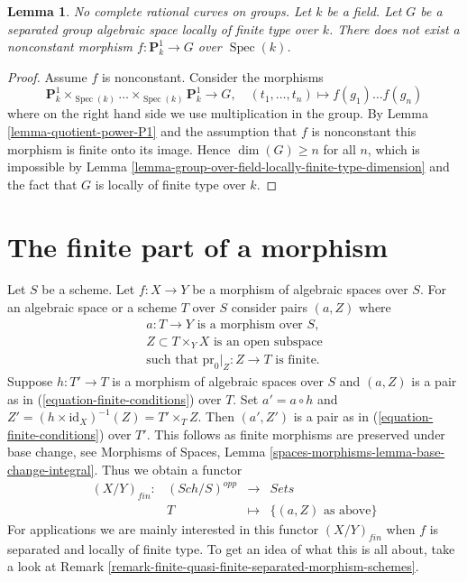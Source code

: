 \documentclass{stacks-project}
\newenvironment{slogan}{\comment}{\endcomment}
\theoremstyle{plain}
\newtheorem{lemma}[subsection]{Lemma}
\theoremstyle{definition}
\theoremstyle{remark}
\numberwithin{equation}{subsection}
\def\Spec{\mathop{\mathrm{Spec}}}
\def\Sch{\mathit{Sch}}
\begin{document}
\begin{lemma}
\label{lemma-no-nonconstant-morphism-from-P1-to-group}
\begin{slogan}
No complete rational curves on groups.
\end{slogan}
Let $k$ be a field. Let $G$ be a separated group algebraic space locally
of finite type over $k$. There does not exist a nonconstant
morphism $f : \mathbf{P}^1_k \to G$ over $\Spec(k)$.
\end{lemma}

\begin{proof}
Assume $f$ is nonconstant. Consider the morphisms
$$
\mathbf{P}^1_k \times_{\Spec(k)} \ldots \times_{\Spec(k)} \mathbf{P}^1_k
\longrightarrow G,
\quad (t_1, \ldots, t_n) \longmapsto f(g_1) \ldots f(g_n)
$$
where on the right hand side we use multiplication in the group.
By Lemma \ref{lemma-quotient-power-P1} and the assumption that $f$
is nonconstant this morphism is finite onto its image.
Hence $\dim(G) \geq n$ for all $n$, which is impossible by
Lemma \ref{lemma-group-over-field-locally-finite-type-dimension}
and the fact that $G$ is locally of finite type over $k$.
\end{proof}




\section{The finite part of a morphism}
\label{section-finite}

\noindent
Let $S$ be a scheme.
Let $f : X \to Y$ be a morphism of algebraic spaces over $S$.
For an algebraic space or a scheme $T$ over $S$ consider pairs
$(a, Z)$ where
\begin{equation}
\label{equation-finite-conditions}
\begin{matrix}
a : T \to Y\text{ is a morphism over }S, \\
Z \subset T \times_Y X\text{ is an open subspace} \\
\text{such that }\text{pr}_0|_Z : Z \to T\text{ is finite.}
\end{matrix}
\end{equation}
Suppose $h : T' \to T$ is a morphism of algebraic spaces over $S$
and $(a, Z)$ is a pair as in (\ref{equation-finite-conditions}) over $T$. Set
$a' = a \circ h$ and $Z' = (h \times \text{id}_X)^{-1}(Z) = T' \times_T Z$.
Then $(a', Z')$ is a pair as in (\ref{equation-finite-conditions}) over $T'$.
This follows as finite morphisms are preserved under base change, see
Morphisms of Spaces, Lemma \ref{spaces-morphisms-lemma-base-change-integral}.
Thus we obtain a functor
\begin{equation}
\label{equation-finite}
\begin{matrix}
(X/Y)_{fin} : &
(\Sch/S)^{opp} &
\longrightarrow &
\textit{Sets} \\
& T & \longmapsto &
\{(a, Z)\text{ as above}\}
\end{matrix}
\end{equation}
For applications we are mainly interested in this functor $(X/Y)_{fin}$
when $f$ is separated and locally of finite type. To get an idea
of what this is all about, take a look at
Remark \ref{remark-finite-quasi-finite-separated-morphism-schemes}.
\end{document}
